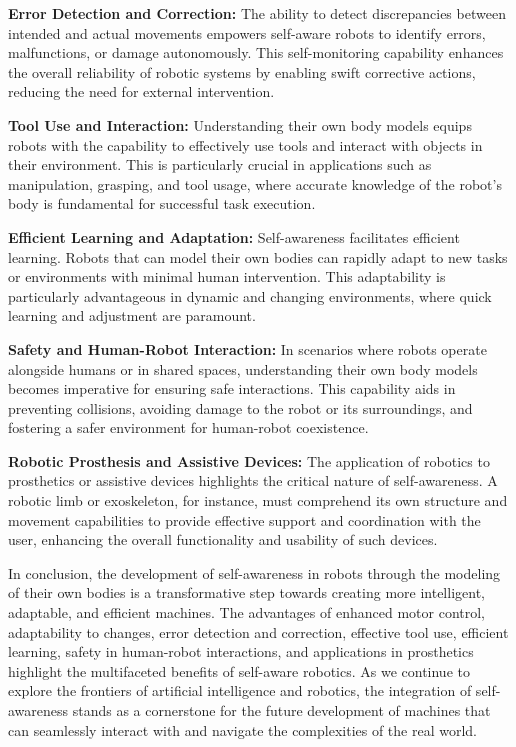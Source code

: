 \textbf{Error Detection and Correction:}
The ability to detect discrepancies between intended and actual movements empowers self-aware robots to identify errors, malfunctions, or damage autonomously. This self-monitoring capability enhances the overall reliability of robotic systems by enabling swift corrective actions, reducing the need for external intervention.

\textbf{Tool Use and Interaction:} Understanding their own body models equips robots with the capability to effectively use tools and interact with objects in their environment. This is particularly crucial in applications such as manipulation, grasping, and tool usage, where accurate knowledge of the robot's body is fundamental for successful task execution.

\textbf{Efficient Learning and Adaptation:} Self-awareness facilitates efficient learning. Robots that can model their own bodies can rapidly adapt to new tasks or environments with minimal human intervention. This adaptability is particularly advantageous in dynamic and changing environments, where quick learning and adjustment are paramount.

\textbf{Safety and Human-Robot Interaction:} In scenarios where robots operate alongside humans or in shared spaces, understanding their own body models becomes imperative for ensuring safe interactions. This capability aids in preventing collisions, avoiding damage to the robot or its surroundings, and fostering a safer environment for human-robot coexistence.

\textbf{Robotic Prosthesis and Assistive Devices:} The application of robotics to prosthetics or assistive devices highlights the critical nature of self-awareness. A robotic limb or exoskeleton, for instance, must comprehend its own structure and movement capabilities to provide effective support and coordination with the user, enhancing the overall functionality and usability of such devices.

In conclusion, the development of self-awareness in robots through the modeling of their own bodies is a transformative step towards creating more intelligent, adaptable, and efficient machines. The advantages of enhanced motor control, adaptability to changes, error detection and correction, effective tool use, efficient learning, safety in human-robot interactions, and applications in prosthetics highlight the multifaceted benefits of self-aware robotics. As we continue to explore the frontiers of artificial intelligence and robotics, the integration of self-awareness stands as a cornerstone for the future development of machines that can seamlessly interact with and navigate the complexities of the real world.